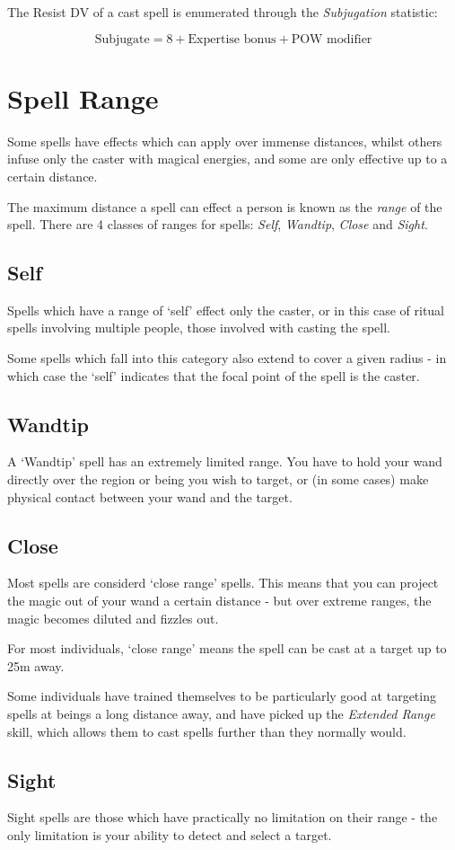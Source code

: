 The Resist DV of a cast spell is enumerated through the {\it Subjugation} statistic:

$$\text{Subjugate} = 8 + \text{Expertise bonus}  + \text{POW modifier}$$



\section{Spell Range} \label{S:Range}

Some spells have effects which can apply over immense distances, whilst others infuse only the caster with magical energies, and some are only effective up to a certain distance. 

The maximum distance a spell can effect a person is known as the {\it range} of the spell. There are 4 classes of ranges for spells: {\it Self}, {\it Wandtip}, {\it Close} and {\it Sight}.

\subsection{Self}

Spells which have a range of `self' effect only the caster, or in this case of ritual spells involving multiple people, those involved with casting the spell.   

Some spells which fall into this category also extend to cover a given radius - in which case the `self' indicates that the focal point of the spell is the caster. 

\subsection{Wandtip}

A `Wandtip' spell has an extremely limited range. You have to hold your wand directly over the region or being you wish to target, or (in some cases) make physical contact between your wand and the target. 

\subsection{Close}

Most spells are considerd `close range' spells. This means that you can project the magic out of your wand a certain distance - but over extreme ranges, the magic becomes diluted and fizzles out. 

For most individuals, `close range' means the spell can be cast at a target up to 25m away. 

Some individuals have trained themselves to be particularly good at targeting spells at beings a long distance away, and have picked up the {\it Extended Range} skill, which allows them to cast spells further than they normally would. 

\subsection{Sight}

Sight spells are those which have practically no limitation on their range - the only limitation is your ability to detect and select a target.  


